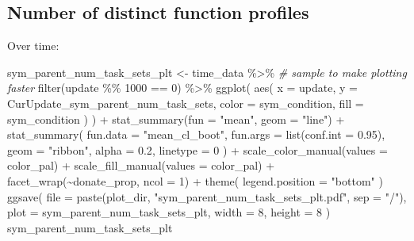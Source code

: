 \documentclass[
]{book}
\newenvironment{Shaded}{\begin{snugshade}}{\end{snugshade}}
\newcommand{\AttributeTok}[1]{\textcolor[rgb]{0.77,0.63,0.00}{#1}}
\newcommand{\CommentTok}[1]{\textcolor[rgb]{0.56,0.35,0.01}{\textit{#1}}}
\newcommand{\DecValTok}[1]{\textcolor[rgb]{0.00,0.00,0.81}{#1}}
\newcommand{\FloatTok}[1]{\textcolor[rgb]{0.00,0.00,0.81}{#1}}
\newcommand{\FunctionTok}[1]{\textcolor[rgb]{0.00,0.00,0.00}{#1}}
\newcommand{\NormalTok}[1]{#1}
\newcommand{\OtherTok}[1]{\textcolor[rgb]{0.56,0.35,0.01}{#1}}
\newcommand{\SpecialCharTok}[1]{\textcolor[rgb]{0.00,0.00,0.00}{#1}}
\newcommand{\StringTok}[1]{\textcolor[rgb]{0.31,0.60,0.02}{#1}}
\begin{document}
\hypertarget{number-of-distinct-function-profiles-7}{%
\subsection{Number of distinct function profiles}\label{number-of-distinct-function-profiles-7}}

Over time:

\begin{Shaded}
\begin{Highlighting}[]
\NormalTok{sym\_parent\_num\_task\_sets\_plt }\OtherTok{\textless{}{-}}\NormalTok{ time\_data }\SpecialCharTok{\%\textgreater{}\%}
  \CommentTok{\# sample to make plotting faster}
  \FunctionTok{filter}\NormalTok{(update }\SpecialCharTok{\%\%} \DecValTok{1000} \SpecialCharTok{==} \DecValTok{0}\NormalTok{) }\SpecialCharTok{\%\textgreater{}\%}
  \FunctionTok{ggplot}\NormalTok{(}
    \FunctionTok{aes}\NormalTok{(}
      \AttributeTok{x =}\NormalTok{ update,}
      \AttributeTok{y =}\NormalTok{ CurUpdate\_sym\_parent\_num\_task\_sets,}
      \AttributeTok{color =}\NormalTok{ sym\_condition,}
      \AttributeTok{fill =}\NormalTok{ sym\_condition}
\NormalTok{    )}
\NormalTok{  ) }\SpecialCharTok{+}
  \FunctionTok{stat\_summary}\NormalTok{(}\AttributeTok{fun =} \StringTok{"mean"}\NormalTok{, }\AttributeTok{geom =} \StringTok{"line"}\NormalTok{) }\SpecialCharTok{+}
  \FunctionTok{stat\_summary}\NormalTok{(}
    \AttributeTok{fun.data =} \StringTok{"mean\_cl\_boot"}\NormalTok{,}
    \AttributeTok{fun.args =} \FunctionTok{list}\NormalTok{(}\AttributeTok{conf.int =} \FloatTok{0.95}\NormalTok{),}
    \AttributeTok{geom =} \StringTok{"ribbon"}\NormalTok{,}
    \AttributeTok{alpha =} \FloatTok{0.2}\NormalTok{,}
    \AttributeTok{linetype =} \DecValTok{0}
\NormalTok{  ) }\SpecialCharTok{+}
  \FunctionTok{scale\_color\_manual}\NormalTok{(}\AttributeTok{values =}\NormalTok{ color\_pal) }\SpecialCharTok{+}
  \FunctionTok{scale\_fill\_manual}\NormalTok{(}\AttributeTok{values =}\NormalTok{ color\_pal) }\SpecialCharTok{+}
  \FunctionTok{facet\_wrap}\NormalTok{(}\SpecialCharTok{\textasciitilde{}}\NormalTok{donate\_prop, }\AttributeTok{ncol =} \DecValTok{1}\NormalTok{) }\SpecialCharTok{+}
  \FunctionTok{theme}\NormalTok{(}
    \AttributeTok{legend.position =} \StringTok{"bottom"}
\NormalTok{  )}
\FunctionTok{ggsave}\NormalTok{(}
  \AttributeTok{file =} \FunctionTok{paste}\NormalTok{(plot\_dir, }\StringTok{"sym\_parent\_num\_task\_sets\_plt.pdf"}\NormalTok{, }\AttributeTok{sep =} \StringTok{"/"}\NormalTok{),}
  \AttributeTok{plot =}\NormalTok{ sym\_parent\_num\_task\_sets\_plt,}
  \AttributeTok{width =} \DecValTok{8}\NormalTok{,}
  \AttributeTok{height =} \DecValTok{8}
\NormalTok{)}
\NormalTok{sym\_parent\_num\_task\_sets\_plt}
\end{Highlighting}
\end{Shaded}
\end{document}
